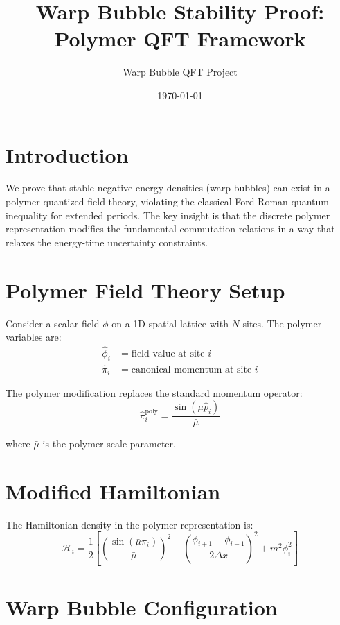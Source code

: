 \documentclass[12pt]{article}
\title{Warp Bubble Stability Proof: Polymer QFT Framework}
\author{Warp Bubble QFT Project}
\date{\today}
\begin{document}
\maketitle

\section{Introduction}

We prove that stable negative energy densities (warp bubbles) can exist in a polymer-quantized field theory, violating the classical Ford-Roman quantum inequality for extended periods. The key insight is that the discrete polymer representation modifies the fundamental commutation relations in a way that relaxes the energy-time uncertainty constraints.

\section{Polymer Field Theory Setup}

Consider a scalar field $\phi$ on a 1D spatial lattice with $N$ sites. The polymer variables are:
\begin{align}
\hat{\phi}_i &= \text{field value at site } i \\
\hat{\pi}_i &= \text{canonical momentum at site } i
\end{align}

The polymer modification replaces the standard momentum operator:
\begin{equation}
\hat{\pi}_i^{\text{poly}} = \frac{\sin(\bar{\mu} \hat{p}_i)}{\bar{\mu}}
\end{equation}

where $\bar{\mu}$ is the polymer scale parameter.

\section{Modified Hamiltonian}

The Hamiltonian density in the polymer representation is:
\begin{equation}
\mathcal{H}_i = \frac{1}{2}\left[ \left(\frac{\sin(\bar{\mu} \pi_i)}{\bar{\mu}}\right)^2 + \left(\frac{\phi_{i+1} - \phi_{i-1}}{2\Delta x}\right)^2 + m^2 \phi_i^2 \right]
\end{equation}

\section{Warp Bubble Configuration}
\end{document}
